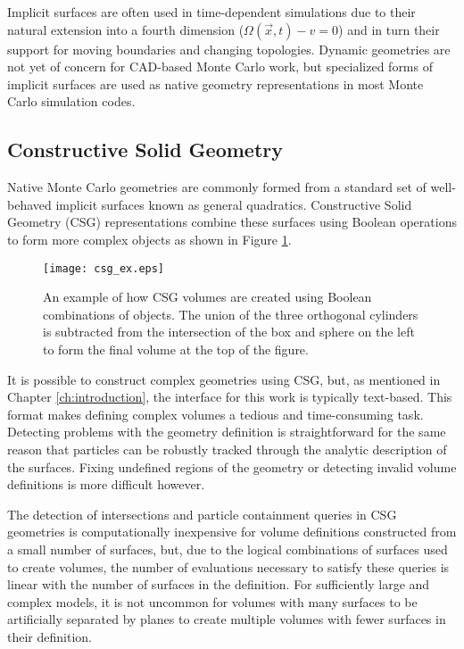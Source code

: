 Implicit surfaces are often used in time-dependent simulations due to their
natural extension into a fourth dimension ($ \Omega(\vec{x},t) - v  = 0 $) and
in turn their support for moving boundaries and changing topologies. Dynamic
geometries are not yet of concern for CAD-based Monte Carlo work, but
specialized forms of implicit surfaces are used as native geometry
representations in most Monte Carlo simulation codes.

\subsection{Constructive Solid Geometry}\label{subsec:csg}

Native Monte Carlo geometries are commonly formed from a standard set of
well-behaved implicit surfaces known as general quadratics. Constructive Solid
Geometry (CSG) representations combine these surfaces using Boolean operations to
form more complex objects as shown in Figure \ref{fig:csg_ex}.

\begin{figure}[h]
  \centering
  \texttt{[image: csg\_ex.eps]}
  \caption[Example of CSG Boolean operations.]{An example of how CSG volumes are created using Boolean combinations
    of objects. The union of the three orthogonal cylinders is
    subtracted from the intersection of the box and sphere on the left to form
    the final volume at the top of the figure.}
  \label{fig:csg_ex}
\end{figure}

It is possible to construct complex geometries using CSG, but, as mentioned in
Chapter \ref{ch:introduction}, the interface for this work is typically
text-based. This format makes defining complex volumes a tedious and
time-consuming task. Detecting problems with the geometry definition is
straightforward for the same reason that particles can be robustly tracked
through the analytic description of the surfaces. Fixing
undefined regions of the geometry or detecting invalid volume definitions is
more difficult however.

The detection of intersections and particle containment queries in CSG
geometries is computationally inexpensive for volume definitions constructed
from a small number of surfaces, but, due to the logical combinations of
surfaces used to create volumes, the number of evaluations necessary to satisfy
these queries is linear with the number of surfaces in the definition. For
sufficiently large and complex models, it is not uncommon for volumes with many
surfaces to be artificially separated by planes to create multiple volumes with
fewer surfaces in their definition.

